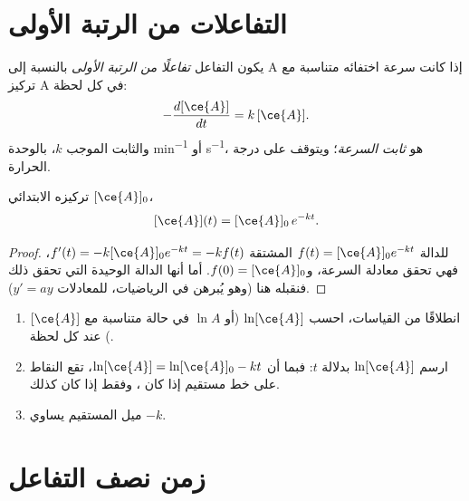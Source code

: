 \section{التفاعلات من الرتبة الأولى}

\begin{definition}\label{def:g12:reaction-rates:first-order}
يكون التفاعل \emph{تفاعلًا من الرتبة الأولى}
بالنسبة إلى A إذا كانت سرعة اختفائه متناسبة مع
تركيز A في كل لحظة:
\[
  -\frac{d[\ce{A}]}{dt} = k\,[\ce{A}] .
\]
والثابت الموجب $k$، بالوحدة \si{min^{-1}} أو \si{s^{-1}}، هو
\emph{ثابت السرعة}؛ ويتوقف على درجة الحرارة.
\end{definition}

\begin{proposition}\label{prop:g12:reaction-rates:exponential}
 تركيزه الابتدائي $[\ce{A}]_0$،
\[
  [\ce{A}](t) = [\ce{A}]_0\, e^{-kt} .
\]
\end{proposition}

\begin{proof}
للدالة $f(t) = [\ce{A}]_0 e^{-kt}$ المشتقة
$f'(t) = -k [\ce{A}]_0 e^{-kt} = -k f(t)$، فهي تحقق معادلة
السرعة، و$f(0) = [\ce{A}]_0$. أما أنها الدالة الوحيدة التي تحقق ذلك فنقبله
هنا (وهو يُبرهن في الرياضيات، للمعادلات $y' = ay$).
\end{proof}

\begin{method}\label{met:g12:reaction-rates:test}
\begin{enumerate}
  \item انطلاقًا من القياسات، احسب $\ln [\ce{A}]$ (أو $\ln A$ في حالة
         متناسبة مع $[\ce{A}]$) عند كل لحظة.
  \item ارسم $\ln[\ce{A}]$ بدلالة $t$: فبما أن
        $\ln[\ce{A}] = \ln[\ce{A}]_0 - kt$، تقع النقاط على خط
        مستقيم إذا كان ، وفقط إذا كان كذلك.
  \item ميل المستقيم يساوي $-k$.
\end{enumerate}
\end{method}

\section{زمن نصف التفاعل}

